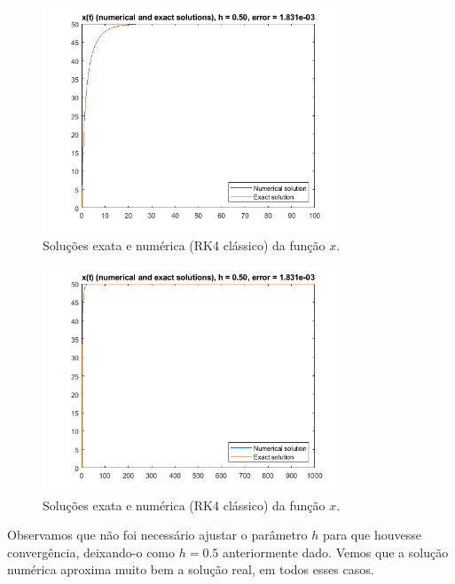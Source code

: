 \documentclass{article}
\begin{document}
\begin{enumerate}
\begin{enumerate}
                        \begin{figure}[!h]
                            \centering
                            \includegraphics[width=0.8\textwidth]{images/rk_3.png}
                            \caption{Soluções exata e numérica (RK4 clássico)
                            da função $x$.}
                            \label{fig:rk_3}
                        \end{figure}
                
                        \begin{figure}[!h]
                            \centering
                            \includegraphics[width=0.8\textwidth]{images/rk_4.png}
                            \caption{Soluções exata e numérica (RK4 clássico)
                            da função $x$.}
                            \label{fig:rk_4}
                        \end{figure}

                        \clearpage

                        Observamos que não foi necessário ajustar o parâmetro
                        $h$ para que houvesse convergência, deixando-o como
                        $h = 0.5$ anteriormente dado. Vemos que a solução
                        numérica aproxima muito bem a solução real, em todos
                        esses casos.


\end{enumerate}
\end{enumerate}
\end{document}
